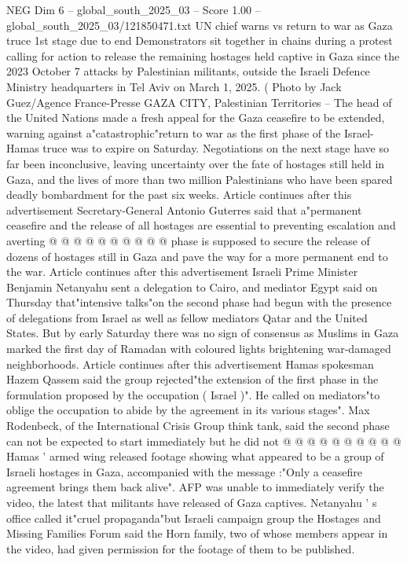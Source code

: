 \begin{textsample}{NEG Dim 6 – global\_south\_2025\_03 – Score 1.00 – global\_south\_2025\_03/121850471.txt}  \label{ex:f6_neg_222}
UN chief warns vs return to war as Gaza truce 1st stage due to end Demonstrators sit together in chains during a protest calling for action to release the remaining hostages held captive in Gaza since the 2023 October 7 attacks by Palestinian militants, outside the Israeli Defence Ministry headquarters in Tel Aviv on March 1, 2025. ( Photo by Jack Guez/Agence France-Presse GAZA CITY, Palestinian Territories -- The head of the United Nations made a fresh appeal for the Gaza ceasefire to be extended, warning against a"catastrophic"return to war as the first phase of the Israel-Hamas truce was to expire on Saturday.
Negotiations on the next stage have so far been inconclusive, leaving uncertainty over the fate of hostages still held in Gaza, and the lives of more than two million Palestinians who have been spared deadly bombardment for the past six weeks.
Article continues after this advertisement Secretary-General Antonio Guterres said that a"permanent ceasefire and the release of all hostages are essential to preventing escalation and averting @ @ @ @ @ @ @ @ @ @ phase is supposed to secure the release of dozens of hostages still in Gaza and pave the way for a more permanent end to the war.
Article continues after this advertisement Israeli Prime Minister Benjamin Netanyahu sent a delegation to Cairo, and mediator Egypt said on Thursday that"intensive talks"on the second phase had begun with the presence of delegations from Israel as well as fellow mediators Qatar and the United States.
But by early Saturday there was no sign of consensus as Muslims in Gaza marked the first day of Ramadan with coloured lights brightening war-damaged neighborhoods.
Article continues after this advertisement Hamas spokesman Hazem Qassem said the group rejected"the extension of the first phase in the formulation proposed by the occupation ( Israel )".
He called on mediators"to oblige the occupation to abide by the agreement in its various stages".
Max Rodenbeck, of the International Crisis Group think tank, said the second phase can not be expected to start immediately but he did not @ @ @ @ @ @ @ @ @ @ Hamas ' armed wing released footage showing what appeared to be a group of Israeli hostages in Gaza, accompanied with the message :"Only a ceasefire agreement brings them back alive".
AFP was unable to immediately verify the video, the latest that militants have released of Gaza captives.
Netanyahu ' s office called it"cruel propaganda"but Israeli campaign group the Hostages and Missing Families Forum said the Horn family, two of whose members appear in the video, had given permission for the footage of them to be published.

\end{textsample}
